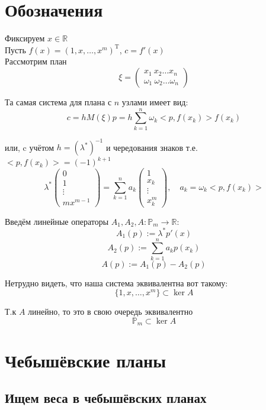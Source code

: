 \documentclass[12pt,a4paper]{article}
\begin{document}
	
	\tableofcontents
	
	\newpage
	\section{Обозначения}
	Фиксируем $x \in \mathbb{R}$\\
	Пусть $f(x) = (1, x, \ldots, x^m)^\mathrm{T}$, $c=f'(x)$\\
	
	\noindent Рассмотрим план
	\[
	\xi = 
	\left(
	\begin{matrix}
		x_1 \ x_2 \ldots x_n \\
		\omega_1 \ \omega_2 \ldots \omega_n	
	\end{matrix}
	\right)
	\]
	
	\noindent Та самая система для плана с $n$ узлами имеет вид:
	\[
	c = h M(\xi) p = h \sum_{k=1}^{n} \omega_k <p,f(x_k)> f(x_k)
	\]	
	
	\noindent или, c учётом $h = (\lambda ^*)^{-1}$ и чередования знаков т.е. $<p,f(x_k)> = (-1)^{k+1}$
	\[
	\lambda ^*
	\begin{pmatrix}
		0 \\
		1 \\
		\vdots \\
		m x^{m-1}
	\end{pmatrix} = 
	\sum_{k=1}^{n} a_k 
	\begin{pmatrix}
		1 \\
		x_k \\
		\vdots \\
		x_k^{m}
	\end{pmatrix}, \quad a_k = \omega_k <p,f(x_k)>
	\]
	
	\noindent Введём линейные операторы $A_1, A_2, A: \mathbb{P}_m \to \mathbb{R}$:
	\[
	A_1(p) := \lambda^* p'(x)
	\]
	\[
	A_2(p) := \sum_{k=1}^{n} a_k p(x_k)
	\]
	\[
	A(p) := A_1(p) - A_2(p)
	\]
	
	\noindent Нетрудно видеть, что наша система эквивалентна вот такому:
	\[
	\lbrace 1, x, \ldots, x^m \rbrace \subset \ker A
	\]
	
	\noindent Т.к $A$ линейно, то это в свою очередь эквивалентно
	\begin{equation}
		\mathbb{P}_m \subset \ker A
		\label{eq:cond1}
	\end{equation}
	
	
	\newpage
	\section{Чебышёвские планы}
	\subsection{Ищем веса в чебышёвских планах}
	
\end{document}
